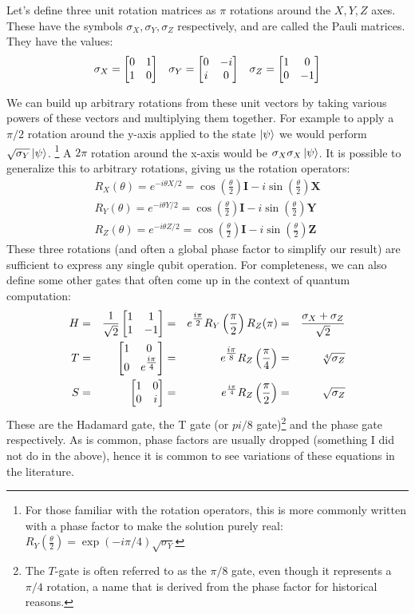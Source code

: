 Let's define three unit rotation matrices as $\pi$ rotations around the $X, Y, Z$ axes. These have the symbols 
$\sigma_X, \sigma_Y, \sigma_Z$ respectively, and are called the Pauli matrices.
They have the values:
\begin{align}
  \sigma_X = \begin{bmatrix}0&1\\1&0\end{bmatrix} && \sigma_Y = \begin{bmatrix}0&-i\\i&0\end{bmatrix} && \sigma_Z = \begin{bmatrix}1&0\\0&-1\end{bmatrix}
\end{align}

We can build up arbitrary rotations from these unit vectors by taking various powers of these vectors
and multiplying them together. For example to apply a $\pi/2$ rotation around the y-axis applied to the state $\ket{\psi}$
we would perform $\sqrt{\sigma_Y}\ket{\psi}$. \footnote{For those familiar with the rotation operators,
this is more commonly written with a phase factor to make the solution purely real: $R_Y(\tfrac{\theta}{2})
= \exp(-i\pi/4)\sqrt{\sigma_Y}$}
A $2\pi$ rotation around the x-axis would be $\sigma_X\sigma_X\ket{\psi}$. It is possible to generalize this 
to arbitrary rotations, giving us the rotation operators\cite{Nielsen:rot}:
\begin{align}
  R_X(\theta) = e^{-i \theta X/2} = \cos\left(\frac{\theta}{2}\right)\boldsymbol{I} - i \sin\left(\frac{\theta}{2}\right)\boldsymbol{X} \\
  R_Y(\theta) = e^{-i \theta Y/2} = \cos\left(\frac{\theta}{2}\right)\boldsymbol{I} - i \sin\left(\frac{\theta}{2}\right)\boldsymbol{Y} \\
  R_Z(\theta) = e^{-i \theta Z/2} = \cos\left(\frac{\theta}{2}\right)\boldsymbol{I} - i \sin\left(\frac{\theta}{2}\right)\boldsymbol{Z}
\end{align}
These three rotations (and often a global phase factor to simplify our result) are sufficient to express
any single qubit operation. For completeness, we can also define some other gates that often come up in
the context of quantum computation:
\begin{alignat}{4}
    H &=& \frac{1}{\sqrt{2}}\begin{bmatrix}1&1\\1&-1\end{bmatrix} &=& e^{\tfrac{i\pi}{2}} R_Y\left(\frac{\pi}{2}\right) R_Z(\pi)            &=& \frac{\sigma_X+\sigma_Z}{\sqrt{2}} \\
    T &=& \begin{bmatrix}1&0\\0&e^{\tfrac{i\pi}{4}}\end{bmatrix}  &=& e^{\tfrac{i\pi}{8}} R_Z\left(\frac{\pi}{4}\right) &=& \sqrt[4]{\sigma_Z} \\
    S &=& \begin{bmatrix}1&0\\0&i\end{bmatrix}                    &=& e^{\frac{i \pi}{4}} R_Z\left(\frac{\pi}{2}\right) &=& \sqrt{\sigma_Z}
\end{alignat}
These are the Hadamard gate, the T gate (or $pi/8$ gate)\footnote{The $T$-gate is often 
referred to as the $\pi/8$ gate, even though it represents a $\pi/4$ rotation, a name that is derived from
the phase factor for historical reasons.} and the phase gate respectively.
As is common, phase factors are usually dropped (something I did not do in the above), hence it is
common to see variations of these equations in the literature. 

